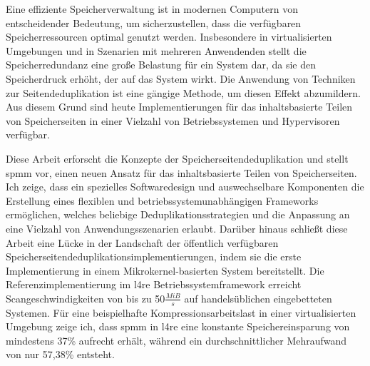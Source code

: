 Eine effiziente Speicherverwaltung ist in modernen Computern von entscheidender Bedeutung, um sicherzustellen, dass die verfügbaren Speicherressourcen optimal genutzt werden.
Insbesondere in virtualisierten Umgebungen und in Szenarien mit mehreren Anwendenden stellt die Speicherredundanz eine große Belastung für ein System dar, da sie den Speicherdruck erhöht, der auf das System wirkt.
Die Anwendung von Techniken zur Seitendeduplikation ist eine gängige Methode, um diesen Effekt abzumildern.
Aus diesem Grund sind heute Implementierungen für das inhaltsbasierte Teilen von Speicherseiten in einer Vielzahl von Betriebssystemen und Hypervisoren verfügbar.

Diese Arbeit erforscht die Konzepte der Speicherseitendeduplikation und stellt \acs{spmm} vor, einen neuen Ansatz für das inhaltsbasierte Teilen von Speicherseiten.
Ich zeige, dass ein spezielles Softwaredesign und auswechselbare Komponenten die Erstellung eines flexiblen und betriebssystemunabhängigen Frameworks ermöglichen, welches beliebige Deduplikationsstrategien und die Anpassung an eine Vielzahl von Anwendungsszenarien erlaubt.
Darüber hinaus schließt diese Arbeit eine Lücke in der Landschaft der öffentlich verfügbaren Speicherseitendeduplikationsimplementierungen, indem sie die erste Implementierung in einem Mikrokernel-basierten System bereitstellt.
Die Referenzimplementierung im \acs{l4re} Betriebssystemframework erreicht Scangeschwindigkeiten von bis zu 50$\frac{MiB}{s}$ auf handelsüblichen eingebetteten Systemen.
Für eine beispielhafte Kompressionsarbeitslast in einer virtualisierten Umgebung zeige ich, dass \acs{spmm} in \acs{l4re} eine konstante Speichereinsparung von mindestens 37\% aufrecht erhält, während ein durchschnittlicher Mehraufwand von nur 57,38\% entsteht.
